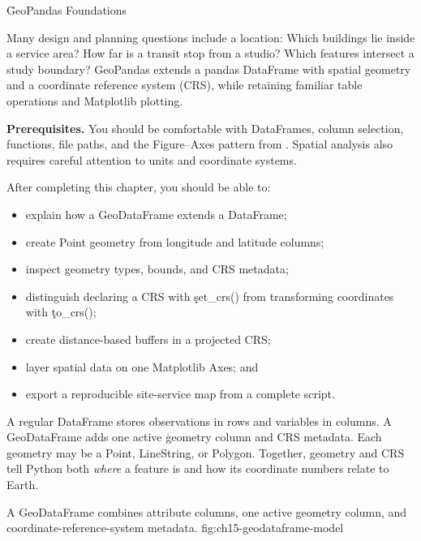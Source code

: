 
\h{GeoPandas Foundations}
\label{ch:15}

Many design and planning questions include a location: Which buildings lie
inside a service area? How far is a transit stop from a studio? Which features
intersect a study boundary? GeoPandas extends a pandas DataFrame with spatial
geometry and a coordinate reference system (CRS), while retaining familiar
table operations and Matplotlib plotting.

\begin{NoteBox}
\textbf{Prerequisites.} You should be comfortable with DataFrames, column
selection, functions, file paths, and the Figure--Axes pattern from
. Spatial analysis also requires careful attention
to units and coordinate systems.
\end{NoteBox}

\begin{tcolorbox}[title=Learning outcomes,colframe=orange,colback=white,arc=2mm]
After completing this chapter, you should be able to:
\begin{itemize}
    \item explain how a GeoDataFrame extends a DataFrame;
    \item create Point geometry from longitude and latitude columns;
    \item inspect geometry types, bounds, and CRS metadata;
    \item distinguish declaring a CRS with \c{set_crs()} from transforming
          coordinates with \c{to_crs()};
    \item create distance-based buffers in a projected CRS;
    \item layer spatial data on one Matplotlib Axes; and
    \item export a reproducible site-service map from a complete script.
\end{itemize}
\end{tcolorbox}


A regular DataFrame stores observations in rows and variables in columns. A
GeoDataFrame adds one active \c{geometry} column and CRS metadata. Each geometry
may be a Point, LineString, or Polygon. Together, geometry and CRS tell Python
both \emph{where} a feature is and how its coordinate numbers relate to Earth.

{A GeoDataFrame combines attribute columns, one active geometry column, and coordinate-reference-system metadata.}
{fig:ch15-geodataframe-model}

